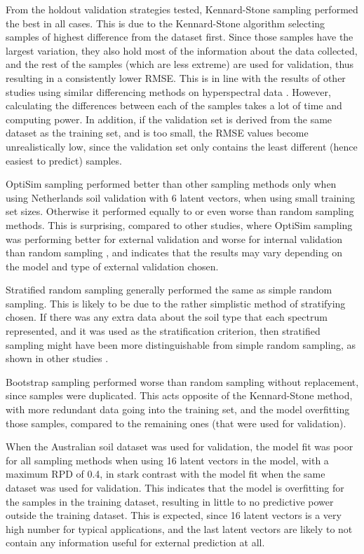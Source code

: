 \documentclass{isprs}
\begin{document}
From the holdout validation strategies tested, Kennard-Stone sampling performed the best in all cases. This is due to the Kennard-Stone algorithm selecting samples of highest difference from the dataset first. Since those samples have the largest variation, they also hold most of the information about the data collected, and the rest of the samples (which are less extreme) are used for validation, thus resulting in a consistently lower RMSE. This is in line with the results of other studies using similar differencing methods on hyperspectral data \cite{golbraikh2000predictive}. However, calculating the differences between each of the samples takes a lot of time and computing power. In addition, if the validation set is derived from the same dataset as the training set, and is too small, the RMSE values become unrealistically low, since the validation set only contains the least different (hence easiest to predict) samples.

OptiSim sampling performed better than other sampling methods only when using Netherlands soil validation with 6 latent vectors, when using small training set sizes. Otherwise it performed equally to or even worse than random sampling methods. This is surprising, compared to other studies, where OptiSim sampling was performing better for external validation and worse for internal validation than random sampling \cite{clark2003boosted}, and indicates that the results may vary depending on the model and type of external validation chosen.

Stratified random sampling generally performed the same as simple random sampling. This is likely to be due to the rather simplistic method of stratifying chosen. If there was any extra data about the soil type that each spectrum represented, and it was used as the stratification criterion, then stratified sampling might have been more distinguishable from simple random sampling, as shown in other studies \cite{kohavi1995study}.

Bootstrap sampling performed worse than random sampling without replacement, since samples were duplicated. This acts opposite of the Kennard-Stone method, with more redundant data going into the training set, and the model overfitting those samples, compared to the remaining ones (that were used for validation).

When the Australian soil dataset was used for validation, the model fit was poor for all sampling methods when using 16 latent vectors in the model, with a maximum RPD of 0.4, in stark contrast with the model fit when the same dataset was used for validation. This indicates that the model is overfitting for the samples in the training dataset, resulting in little to no predictive power outside the training dataset. This is expected, since 16 latent vectors is a very high number for typical applications, and the last latent vectors are likely to not contain any information useful for external prediction at all.
\end{document}
